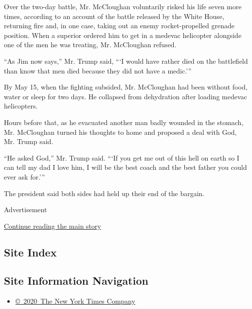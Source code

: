 Over the two-day battle, Mr. McCloughan voluntarily risked his life
seven more times, according to an account of the battle released by the
White House, returning fire and, in one case, taking out an enemy
rocket-propelled grenade position. When a superior ordered him to get in
a medevac helicopter alongside one of the men he was treating, Mr.
McCloughan refused.

``As Jim now says,'' Mr. Trump said, ```I would have rather died on the
battlefield than know that men died because they did not have a
medic.'''

By May 15, when the fighting subsided, Mr. McCloughan had been without
food, water or sleep for two days. He collapsed from dehydration after
loading medevac helicopters.

Hours before that, as he evacuated another man badly wounded in the
stomach, Mr. McCloughan turned his thoughts to home and proposed a deal
with God, Mr. Trump said.

``He asked God,'' Mr. Trump said. ```If you get me out of this hell on
earth so I can tell my dad I love him, I will be the best coach and the
best father you could ever ask for.'''

The president said both sides had held up their end of the bargain.

Advertisement

\protect\hyperlink{after-bottom}{Continue reading the main story}

\hypertarget{site-index}{%
\subsection{Site Index}\label{site-index}}

\hypertarget{site-information-navigation}{%
\subsection{Site Information
Navigation}\label{site-information-navigation}}

\begin{itemize}
\tightlist
\item
  \href{https://help.nytimes.com/hc/en-us/articles/115014792127-Copyright-notice}{©~2020~The
  New York Times Company}
\end{itemize}

